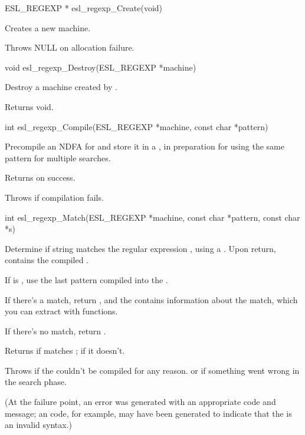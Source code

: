 \begin{sreapi}
\hypertarget{func:esl_regexp_Create()}
{\item[ESL\_REGEXP * esl\_regexp\_Create(void)]}

Creates a new  machine.

Throws NULL on allocation failure.



\hypertarget{func:esl_regexp_Destroy()}
{\item[void esl\_regexp\_Destroy(ESL\_REGEXP *machine)]}

Destroy a machine created by .

Returns void.


\hypertarget{func:esl_regexp_Compile()}
{\item[int esl\_regexp\_Compile(ESL\_REGEXP *machine, const char *pattern)]}

Precompile an NDFA for  and store it in 
a , in preparation for using the same
pattern for multiple searches.

Returns  on success.

Throws  if compilation fails.


\hypertarget{func:esl_regexp_Match()}
{\item[int esl\_regexp\_Match(ESL\_REGEXP *machine, const char *pattern, const char *s)]}

Determine if string  matches the regular expression
, using a . Upon return, 
contains the compiled .

If  is , use the last pattern compiled
into the . 

If there's a match, return , and the 
contains information about the match, which you can
extract with  functions.

If there's no match, return .

Returns  if  matches ;  if it doesn't.

Throws  if the  couldn't be compiled for any reason.
 or  if something
went wrong in the search phase.

(At the failure point, an error was generated with an appropriate
code and message; an  code, for example, may have
been generated to indicate that the  is an invalid syntax.)



\end{sreapi}
